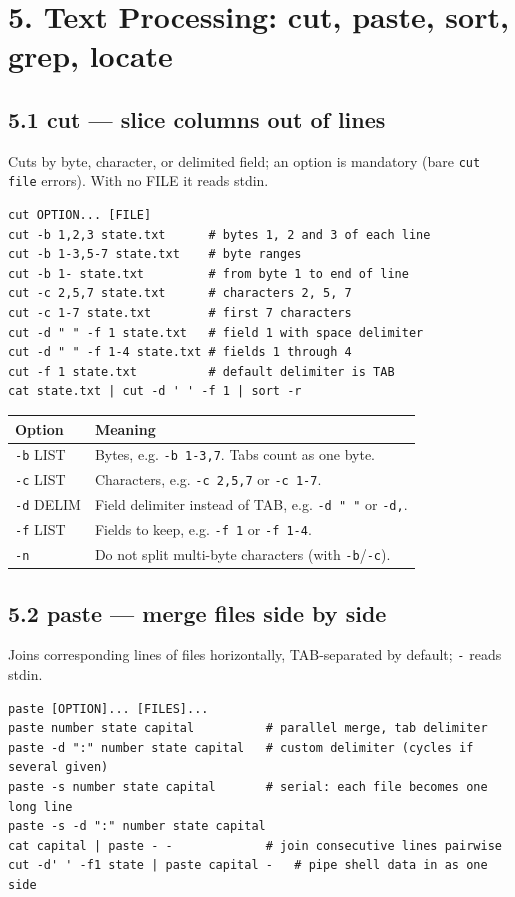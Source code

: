 \documentclass[11pt,a4paper]{article}
\newcommand{\cmd}[1]{\texttt{#1}}
\begin{document}
\section{5. Text Processing: cut, paste, sort, grep, locate}

\subsection{5.1 cut --- slice columns out of lines}
Cuts by byte, character, or delimited field; an option is mandatory (bare \cmd{cut file} errors). With no FILE it reads stdin.
\begin{lstlisting}
cut OPTION... [FILE]
cut -b 1,2,3 state.txt      # bytes 1, 2 and 3 of each line
cut -b 1-3,5-7 state.txt    # byte ranges
cut -b 1- state.txt         # from byte 1 to end of line
cut -c 2,5,7 state.txt      # characters 2, 5, 7
cut -c 1-7 state.txt        # first 7 characters
cut -d " " -f 1 state.txt   # field 1 with space delimiter
cut -d " " -f 1-4 state.txt # fields 1 through 4
cut -f 1 state.txt          # default delimiter is TAB
cat state.txt | cut -d ' ' -f 1 | sort -r
\end{lstlisting}
\begin{center}
\small
\begin{tabularx}{\textwidth}{lX}
\toprule
Option & Meaning \\
\midrule
\cmd{-b} LIST & Bytes, e.g. \cmd{-b 1-3,7}. Tabs count as one byte. \\
\cmd{-c} LIST & Characters, e.g. \cmd{-c 2,5,7} or \cmd{-c 1-7}. \\
\cmd{-d} DELIM & Field delimiter instead of TAB, e.g. \cmd{-d " "} or \cmd{-d,}. \\
\cmd{-f} LIST & Fields to keep, e.g. \cmd{-f 1} or \cmd{-f 1-4}. \\
\cmd{-n} & Do not split multi-byte characters (with \cmd{-b}/\cmd{-c}). \\
\bottomrule
\end{tabularx}
\end{center}

\subsection{5.2 paste --- merge files side by side}
Joins corresponding lines of files horizontally, TAB-separated by default; \cmd{-} reads stdin.
\begin{lstlisting}
paste [OPTION]... [FILES]...
paste number state capital          # parallel merge, tab delimiter
paste -d ":" number state capital   # custom delimiter (cycles if several given)
paste -s number state capital       # serial: each file becomes one long line
paste -s -d ":" number state capital
cat capital | paste - -             # join consecutive lines pairwise
cut -d' ' -f1 state | paste capital -   # pipe shell data in as one side
\end{lstlisting}
\end{document}
